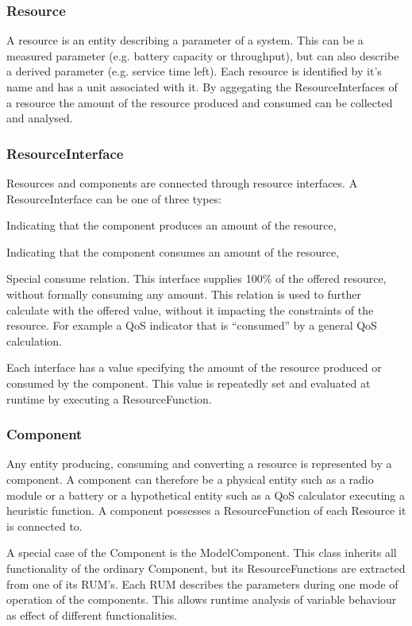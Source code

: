 \subsubsection{Resource}
A resource is an entity describing a parameter of a system. This can be a measured parameter (e.g. battery capacity or throughput), but can also describe a derived parameter (e.g. service time left). Each resource is identified by it's name and has a unit associated with it. By aggegating the ResourceInterfaces of a resource the amount of the resource produced and consumed can be collected and analysed.

\subsubsection{ResourceInterface}
Resources and components are connected through resource interfaces. A ResourceInterface can be one of three types:
\begin{description}
\nospace
\item[Offer] Indicating that the component produces an amount of the resource,
\item[Consume] Indicating that the component consumes an amount of the resource,
\item[Calculate] Special consume relation. This interface supplies 100\% of the offered resource, without formally consuming any amount. This relation is used to further calculate with the offered value, without it impacting the constraints of the resource. For example a QoS indicator that is ``consumed'' by a general QoS calculation.
\end{description}
Each interface has a value specifying the amount of the resource produced or consumed by the component. This value is repeatedly set and evaluated at runtime by executing a ResourceFunction.

\subsubsection{Component}
Any entity producing, consuming and converting a resource is represented by a component. A component can therefore be a physical entity such as a radio module or a battery or a hypothetical entity such as a QoS calculator executing a heuristic function. A component possesses a ResourceFunction of each Resource it is connected to.

A special case of the Component is the ModelComponent. This class inherits all functionality of the ordinary Component, but its ResourceFunctions are extracted from one of its RUM's. Each RUM describes the parameters during one mode of operation of the components. This allows runtime analysis of variable behaviour as effect of different functionalities.

